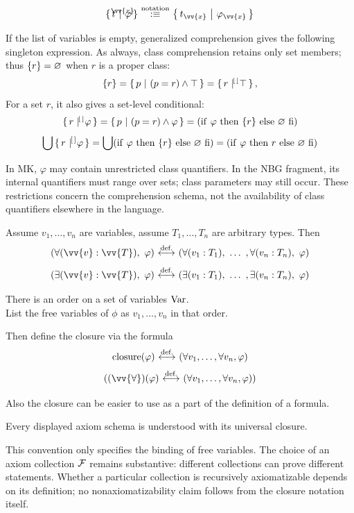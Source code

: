 \begin{notation}
\[
\ccc{{\vv{x}}}{t}{\phi}
\equivnot
\cc{{t_{\vv{x}}}}{\phi_{\vv{x}}}
\]
\end{notation}
If the list of variables is empty, generalized comprehension gives the following singleton expression. As always, class comprehension retains only set members; thus $\{r\}=\varnothing$ when $r$ is a proper class:
\[
\{r\}=\cc{p}{(p=r)\land\top}=\ccc{\,[\,]}{r}{\,\top},
\]
For a set $r$, it also gives a set-level conditional:
\[
\ccc{\,[\,]}{r}{\,\phi}
=
\cc{p}{(p=r)\land\phi}
=
(\lif\ \phi\ \lthen\ \{r\}\ \lelse\ \emptyclass\ \lfi)
\]
\[
\union\ccc{\,[\,]}{r}{\,\phi}
=
\union(\lif\ \phi\ \lthen\ \{r\}\ \lelse\ \emptyclass\ \lfi)
=
(\lif\ \phi\ \lthen\ r\ \lelse\ \emptyclass\ \lfi)
\]

\begin{note}
In MK, $\varphi$ may contain unrestricted class quantifiers. In the NBG
fragment, its internal quantifiers must range over sets; class parameters
may still occur. These restrictions concern the comprehension schema,
not the availability of class quantifiers elsewhere in the language.
\end{note}
\begin{notation}
Assume $v_1,\dots,v_n$ are variables, assume $T_1,\dots,T_n$ are arbitrary types. %
Then
\[
(\forall(\vv{v}:\vv{T}),\ \phi)
\iffdef
(\forall (v_1:T_1),\ \dots\ ,\forall (v_n:T_n),\ \phi)
\]
\[
(\exists(\vv{v}:\vv{T}),\ \phi)
\iffdef
(\exists (v_1:T_1),\ \dots\ ,\exists (v_n:T_n),\ \phi)
\]
\end{notation}

\begin{definition}
There is an order on a set of variables $\mathrm{Var}$.\\
List the free variables of $\phi$ as $v_1, \dots, v_n$ in that order.

Then define the closure via the formula
\[
\text{closure}(\varphi) \ {\stackrel{{\textrm{def.}}}{\longleftrightarrow}}\  (\forall v_1,\dots,\forall v_n, \varphi)
\]
\[
((\vv{\forall})(\phi) \iffdef (\forall v_1,\dots,\forall v_n, \phi)
)
\]

Also the closure can be easier to use as a part of the definition of a formula.

Every displayed axiom schema is understood with its universal closure.

This convention only specifies the binding of free variables. The choice
of an axiom collection ${\mathcal{F}}$ remains substantive: different collections
can prove different statements. Whether a particular collection is
recursively axiomatizable depends on its definition; no nonaxiomatizability
claim follows from the closure notation itself.
\end{definition}

